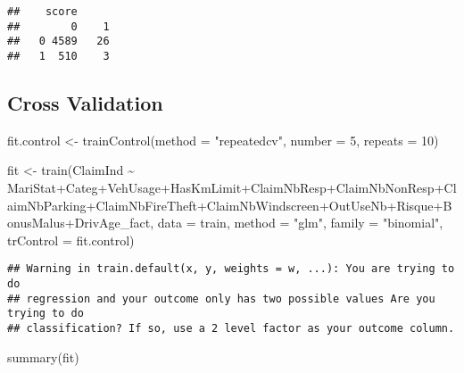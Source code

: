 \documentclass[
]{article}
\newenvironment{Shaded}{\begin{snugshade}}{\end{snugshade}}
\newcommand{\AttributeTok}[1]{\textcolor[rgb]{0.77,0.63,0.00}{#1}}
\newcommand{\DecValTok}[1]{\textcolor[rgb]{0.00,0.00,0.81}{#1}}
\newcommand{\FunctionTok}[1]{\textcolor[rgb]{0.00,0.00,0.00}{#1}}
\newcommand{\NormalTok}[1]{#1}
\newcommand{\OtherTok}[1]{\textcolor[rgb]{0.56,0.35,0.01}{#1}}
\newcommand{\SpecialCharTok}[1]{\textcolor[rgb]{0.00,0.00,0.00}{#1}}
\newcommand{\StringTok}[1]{\textcolor[rgb]{0.31,0.60,0.02}{#1}}
\begin{document}
\begin{verbatim}
##    score
##        0    1
##   0 4589   26
##   1  510    3
\end{verbatim}

\hypertarget{cross-validation}{%
\subsection{Cross Validation}\label{cross-validation}}

\begin{Shaded}
\begin{Highlighting}[]
\NormalTok{fit.control }\OtherTok{\textless{}{-}} \FunctionTok{trainControl}\NormalTok{(}\AttributeTok{method =} \StringTok{"repeatedcv"}\NormalTok{, }\AttributeTok{number =} \DecValTok{5}\NormalTok{, }\AttributeTok{repeats =} \DecValTok{10}\NormalTok{)}

\NormalTok{fit }\OtherTok{\textless{}{-}} \FunctionTok{train}\NormalTok{(ClaimInd }\SpecialCharTok{\textasciitilde{}}\NormalTok{ MariStat}\SpecialCharTok{+}\NormalTok{Categ}\SpecialCharTok{+}\NormalTok{VehUsage}\SpecialCharTok{+}\NormalTok{HasKmLimit}\SpecialCharTok{+}\NormalTok{ClaimNbResp}\SpecialCharTok{+}\NormalTok{ClaimNbNonResp}\SpecialCharTok{+}\NormalTok{ClaimNbParking}\SpecialCharTok{+}\NormalTok{ClaimNbFireTheft}\SpecialCharTok{+}\NormalTok{ClaimNbWindscreen}\SpecialCharTok{+}\NormalTok{OutUseNb}\SpecialCharTok{+}\NormalTok{Risque}\SpecialCharTok{+}\NormalTok{BonusMalus}\SpecialCharTok{+}\NormalTok{DrivAge\_fact,}
    \AttributeTok{data =}\NormalTok{ train, }\AttributeTok{method =} \StringTok{"glm"}\NormalTok{, }
    \AttributeTok{family =} \StringTok{"binomial"}\NormalTok{, }\AttributeTok{trControl =}\NormalTok{ fit.control)}
\end{Highlighting}
\end{Shaded}

\begin{verbatim}
## Warning in train.default(x, y, weights = w, ...): You are trying to do
## regression and your outcome only has two possible values Are you trying to do
## classification? If so, use a 2 level factor as your outcome column.
\end{verbatim}

\begin{Shaded}
\begin{Highlighting}[]
\FunctionTok{summary}\NormalTok{(fit)}
\end{Highlighting}
\end{Shaded}
\end{document}
